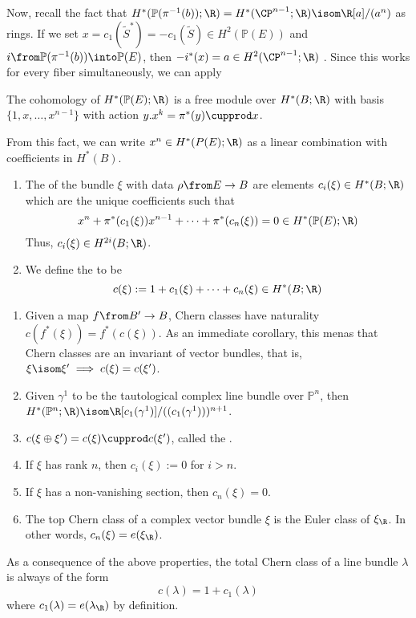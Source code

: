 \documentclass[11pt,leqno,oneside]{amsbook}
\renewcommand{\P}{\mathbb{P}}
\numberwithin{thm}{section}
\begin{document}
Now, recall the fact that \(H^*(\P(\pi^{-1}(b));\R) = H^*(\CP^{n-1};\R) \isom \R[a]/(a^{n})\) as
rings. If we set \(x = c_1(\tilde{S}^*) = -c_1(\tilde{S}) \in
H^2(\P(E))\) and \(i \from \P(\pi^{-1}(b)) \into \P(E)\), then
\(-i^*(x) = a \in H^2(\CP^{n-1};\R)\) . Since this works for every
fiber simultaneously, we can apply
\begin{cor}
  The cohomology of \(H^*(\P(E);\R)\) is a free module over \(H^*(B;\R)\) with basis
  \(\{1,x, \ldots, x^{n-1}\}\) with action \(y.x^k = \pi^* (y)
  \cupprod x\).
\end{cor}
From this fact, we can write \(x^n \in H^*(P(E);\R)\) as a linear
combination with coefficients in \(H^*(B)\).
\begin{defn}\label{general-def-of-chern-classes}
  \begin{enumerate}
  \item The  of the bundle \(\xi\) with data
    \(\rho \from E \to B\) are elements \(c_i(\xi) \in H^*(B;\R)\)
    which are the unique coefficients such that
    \[ x^n + \pi^*(c_1(\xi)) x^{n-1} + \cdots + \pi^*(c_n(\xi)) = 0 \in
      H^*(\P(E);\R)
    \]
    Thus, \(c_i(\xi) \in H^{2i}(B;\R)\).
  \item We define the  to be \[
      c(\xi) := 1 + c_1(\xi) + \cdots + c_n(\xi) \in H^*(B;\R)
    \]
  \end{enumerate}
\end{defn}
\begin{prop}\label{chern-class-props}
  \begin{enumerate}
  \item Given a map \(f \from B' \to B\), Chern classes have
    naturality \(c(f^*(\xi)) = f^*(c(\xi))\). As an immediate
    corollary, this menas that Chern classes are an invariant of
    vector bundles, that is, \(\xi \isom \xi' \implies c(\xi) =
    c(\xi')\). 
  \item Given \(\gamma^1\) to be the tautological complex line bundle
    over \(\P^n\), then \(H^*(\P^n;\R) \isom
    \R[c_1(\gamma^1)]/((c_1(\gamma^1)))^{n+1}\).
  \item \(c(\xi \oplus \xi') = c(\xi) \cupprod c(\xi')\), called the
    .
  \item If \(\xi\) has rank \(n\), then \(c_i(\xi) := 0\) for \(i >
    n\).
  \item If \(\xi\) has a non-vanishing section, then \(c_n(\xi) = 0\).
  \item The top Chern class of a complex vector bundle \(\xi\) is the
    Euler class of \(\xi_\R\). In other words, \(c_n(\xi) =
    e(\xi_\R)\). 
  \end{enumerate}
\end{prop}
\begin{cor}\label{total-class-of-line-bundle}
  As a consequence of the above properties, the total Chern class of a
  line bundle \(\lambda\) is always of the form \[
    c(\lambda) = 1 + c_1(\lambda)
  \]
  where \(c_1(\lambda) = e(\lambda_\R)\) by definition.
\end{cor}
\end{document}
